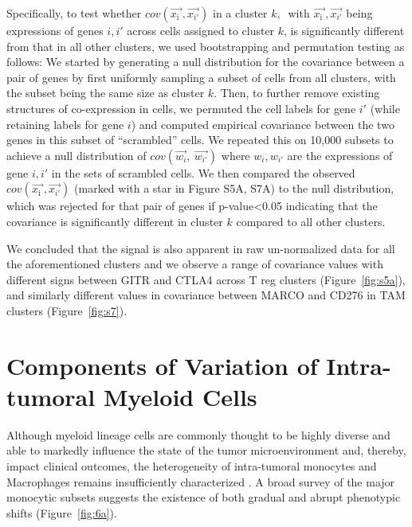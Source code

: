 Specifically, to test whether \(cov(\overrightarrow{x_{\text{i\ }}},\overrightarrow{x_{i'}})\) in a cluster \(k,\ \) with \(\overrightarrow{x_{\text{i\ }}},\overrightarrow{x_{i'}}\) being expressions of genes \(i,i'\) across cells assigned to cluster \(k\), is significantly different from that in all other clusters, we used bootstrapping and permutation testing as follows: We started by generating a null distribution for the covariance between a pair of genes by first uniformly sampling a subset of cells from all clusters, with the subset being the same size as cluster \(k\).
Then, to further remove existing structures of co-expression in cells, we permuted the cell labels for gene \(i'\) (while retaining labels for gene \(i\)) and computed empirical covariance between the two genes in this subset of ``scrambled'' cells.
We repeated this on 10,000 subsets to achieve a null distribution of \(cov(\overrightarrow{w_{i}},\ \overrightarrow{w_{i'}})\) where \(w_{i},w_{i'}\) are the expressions of gene \(i,i'\) in the sets of scrambled cells.
We then compared the observed \(cov(\overrightarrow{x_{\text{i\ }}},\overrightarrow{x_{i'}})\) (marked with a star in Figure S5A, S7A) to the null distribution, which was rejected for that pair of genes if p-value\textless{}0.05 indicating that the covariance is significantly different in cluster \(k\) compared to all other clusters.

We concluded that the signal is also apparent in raw un-normalized data for all the aforementioned clusters and we observe a range of covariance values with different signs between GITR and CTLA4 across T reg clusters (Figure~\ref{fig:s5a}), and similarly different values in covariance between MARCO and CD276 in TAM clusters (Figure~\ref{fig:s7}).

\section{Components of Variation of Intra-tumoral Myeloid Cells}

Although myeloid lineage cells are commonly thought to be highly diverse and able to markedly influence the state of the tumor microenvironment and, thereby, impact clinical outcomes, the heterogeneity of intra-tumoral monocytes and Macrophages remains insufficiently characterized \citep{Campbell2011,DeHenau2016,Engblom2016,Eppert2011,Gholamin2017,Pyonteck2013}.
A broad survey of the major monocytic subsets suggests the existence of both gradual and abrupt phenotypic shifts (Figure~\ref{fig:6a}).

